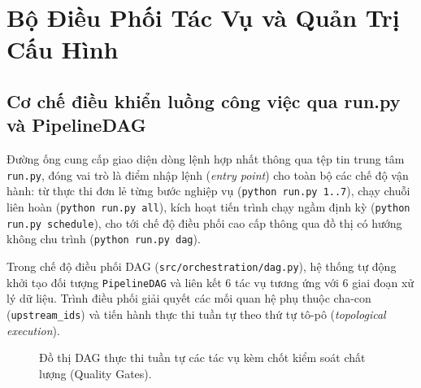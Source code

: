 \section{Bộ Điều Phối Tác Vụ và Quản Trị Cấu Hình}

\subsection{Cơ chế điều khiển luồng công việc qua run.py và PipelineDAG}
Đường ống cung cấp giao diện dòng lệnh hợp nhất thông qua tệp tin trung tâm \texttt{run.py}, đóng vai trò là điểm nhập lệnh (\textit{entry point}) cho toàn bộ các chế độ vận hành: từ thực thi đơn lẻ từng bước nghiệp vụ (\texttt{python run.py 1..7}), chạy chuỗi liên hoàn (\texttt{python run.py all}), kích hoạt tiến trình chạy ngầm định kỳ (\texttt{python run.py schedule}), cho tới chế độ điều phối cao cấp thông qua đồ thị có hướng không chu trình (\texttt{python run.py dag}).

Trong chế độ điều phối DAG (\texttt{src/orchestration/dag.py}), hệ thống tự động khởi tạo đối tượng \texttt{PipelineDAG} và liên kết 6 tác vụ tương ứng với 6 giai đoạn xử lý dữ liệu. Trình điều phối giải quyết các mối quan hệ phụ thuộc cha-con (\texttt{upstream\_ids}) và tiến hành thực thi tuần tự theo thứ tự tô-pô (\textit{topological execution}).

\begin{figure}[htbp]
    \centering
    \caption{Đồ thị DAG thực thi tuần tự các tác vụ kèm chốt kiểm soát chất lượng (Quality Gates).}
    \label{fig:dag_pipeline}
\end{figure}

